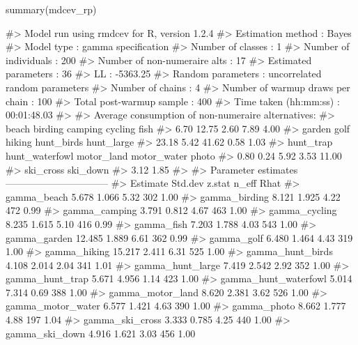 \begin{Schunk}
\begin{Sinput}
summary(mdcev_rp)
\end{Sinput}
\begin{Soutput}
#> Model run using rmdcev for R, version 1.2.4 
#> Estimation method                : Bayes
#> Model type                       : gamma specification
#> Number of classes                : 1
#> Number of individuals            : 200
#> Number of non-numeraire alts     : 17
#> Estimated parameters             : 36
#> LL                               : -5363.25
#> Random parameters                : uncorrelated random parameters
#> Number of chains                 : 4
#> Number of warmup draws per chain : 100
#> Total post-warmup sample         : 400
#> Time taken (hh:mm:ss)            : 00:01:48.03
#> 
#> Average consumption of non-numeraire alternatives:
#>          beach        birding        camping        cycling           fish 
#>           6.70          12.75           2.60           7.89           4.00 
#>         garden           golf         hiking     hunt_birds     hunt_large 
#>          23.18           5.42          41.62           0.58           1.03 
#>      hunt_trap hunt_waterfowl     motor_land    motor_water          photo 
#>           0.80           0.24           5.92           3.53          11.00 
#>      ski_cross       ski_down 
#>           3.12           1.85 
#> 
#> Parameter estimates --------------------------------  
#>                         Estimate Std.dev z.stat n_eff Rhat
#> gamma_beach                5.678   1.066   5.32   302 1.00
#> gamma_birding              8.121   1.925   4.22   472 0.99
#> gamma_camping              3.791   0.812   4.67   463 1.00
#> gamma_cycling              8.235   1.615   5.10   416 0.99
#> gamma_fish                 7.203   1.788   4.03   543 1.00
#> gamma_garden              12.485   1.889   6.61   362 0.99
#> gamma_golf                 6.480   1.464   4.43   319 1.00
#> gamma_hiking              15.217   2.411   6.31   525 1.00
#> gamma_hunt_birds           4.108   2.014   2.04   341 1.01
#> gamma_hunt_large           7.419   2.542   2.92   352 1.00
#> gamma_hunt_trap            5.671   4.956   1.14   423 1.00
#> gamma_hunt_waterfowl       5.014   7.314   0.69   388 1.00
#> gamma_motor_land           8.620   2.381   3.62   526 1.00
#> gamma_motor_water          6.577   1.421   4.63   390 1.00
#> gamma_photo                8.662   1.777   4.88   197 1.04
#> gamma_ski_cross            3.333   0.785   4.25   440 1.00
#> gamma_ski_down             4.916   1.621   3.03   456 1.00

\end{Soutput}
\end{Schunk}
